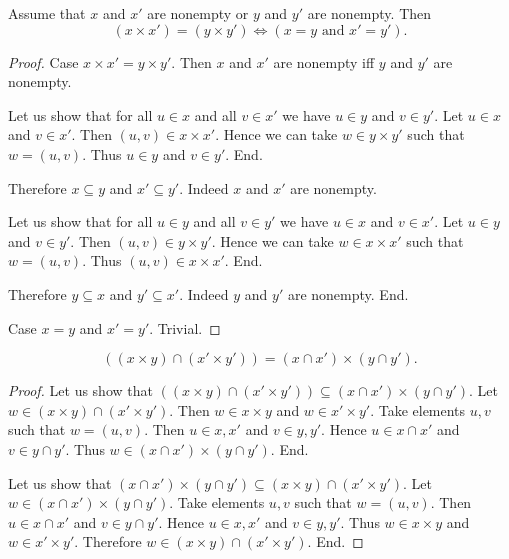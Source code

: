 \documentclass[../../sets-and-functions.ftl.tex]{subfiles}
\begin{document}
\begin{forthel}
    \begin{proposition}[SF 01 05 472623]
      Assume that $x$ and $x'$ are nonempty or $y$ and $y'$ are nonempty.
      Then \[ (x \times x') = (y \times y') \iff (\text{$x = y$ and $x' = y'$}). \]
    \end{proposition}
    \begin{proof}
      Case $x \times x' = y \times y'$.
        Then $x$ and $x'$ are nonempty iff $y$ and $y'$ are nonempty.

        Let us show that for all $u \in x$ and all $v \in x'$ we have $u \in y$ and $v \in y'$.
          Let $u \in x$ and $v \in x'$.
          Then $(u,v) \in x \times x'$.
          Hence we can take $w \in y \times y'$ such that $w = (u,v)$.
          Thus $u \in y$ and $v \in y'$.
        End.

        Therefore $x \subseteq y$ and $x' \subseteq y'$.
        Indeed $x$ and $x'$ are nonempty.

        Let us show that for all $u \in y$ and all $v \in y'$ we have $u \in x$ and $v \in x'$.
          Let $u \in y$ and $v \in y'$.
          Then $(u,v) \in y \times y'$.
          Hence we can take $w \in x \times x'$ such that $w = (u,v)$.
          Thus $(u,v) \in x \times x'$.
        End.

        Therefore $y \subseteq x$ and $y' \subseteq x'$.
        Indeed $y$ and $y'$ are nonempty.
      End.

      Case $x = y$ and $x' = y'$. Trivial.
    \end{proof}

    \begin{proposition}[SF 01 05 261950]
      \[ ((x \times y) \cap (x' \times y')) = (x \cap x') \times (y \cap y'). \]
    \end{proposition}
    \begin{proof}
      Let us show that $((x \times y) \cap (x' \times y')) \subseteq (x \cap x') \times (y \cap y')$.
        Let $w \in (x \times y) \cap (x' \times y')$.
        Then $w \in x \times y$ and $w \in x' \times y'$.
        Take elements $u,v$ such that $w = (u,v)$.
        Then $u \in x,x'$ and $v \in y,y'$.
        Hence $u \in x \cap x'$ and $v \in y \cap y'$.
        Thus $w \in (x \cap x') \times (y \cap y')$.
      End.

      Let us show that $(x \cap x') \times (y \cap y') \subseteq (x \times y) \cap (x' \times y')$.
        Let $w \in (x \cap x') \times (y \cap y')$.
        Take elements $u,v$ such that $w = (u,v)$.
        Then $u \in x \cap x'$ and $v \in y \cap y'$.
        Hence $u \in x,x'$ and $v \in y,y'$.
        Thus $w \in x \times y$ and $w \in x' \times y'$.
        Therefore $w \in (x \times y) \cap (x' \times y')$.
      End.
    \end{proof}


\end{forthel}
\end{document}

